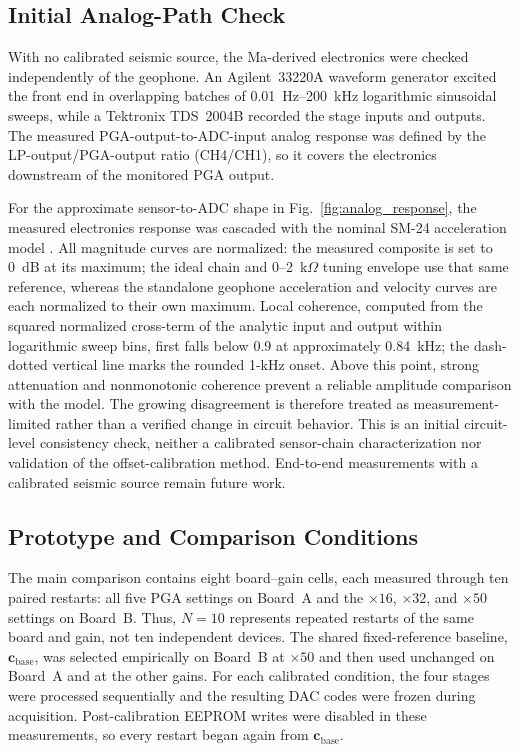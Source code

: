 \subsection{Initial Analog-Path Check}

With no calibrated seismic source, the Ma-derived electronics were checked independently of the geophone. An Agilent~33220A waveform generator excited the front end in overlapping batches of 0.01~Hz--200~kHz logarithmic sinusoidal sweeps, while a Tektronix TDS~2004B recorded the stage inputs and outputs. The measured PGA-output-to-ADC-input analog response was defined by the LP-output/PGA-output ratio (CH4/CH1), so it covers the electronics downstream of the monitored PGA output.

For the approximate sensor-to-ADC shape in Fig.~\ref{fig:analog_response}, the measured electronics response was cascaded with the nominal SM-24 acceleration model \cite{SM24}. All magnitude curves are normalized: the measured composite is set to 0~dB at its maximum; the ideal chain and 0--2~k$\Omega$ tuning envelope use that same reference, whereas the standalone geophone acceleration and velocity curves are each normalized to their own maximum. Local coherence, computed from the squared normalized cross-term of the analytic input and output within logarithmic sweep bins, first falls below 0.9 at approximately 0.84~kHz; the dash-dotted vertical line marks the rounded 1-kHz onset. Above this point, strong attenuation and nonmonotonic coherence prevent a reliable amplitude comparison with the model. The growing disagreement is therefore treated as measurement-limited rather than a verified change in circuit behavior. This is an initial circuit-level consistency check, neither a calibrated sensor-chain characterization nor validation of the offset-calibration method. End-to-end measurements with a calibrated seismic source remain future work.



\subsection{Prototype and Comparison Conditions}

The main comparison contains eight board--gain cells, each measured through ten paired restarts: all five PGA settings on Board~A and the $\times16$, $\times32$, and $\times50$ settings on Board~B. Thus, $N{=}10$ represents repeated restarts of the same board and gain, not ten independent devices. The shared fixed-reference baseline, $\boldsymbol{c}_{\mathrm{base}}$, was selected empirically on Board~B at $\times50$ and then used unchanged on Board~A and at the other gains. For each calibrated condition, the four stages were processed sequentially and the resulting DAC codes were frozen during acquisition. Post-calibration EEPROM writes were disabled in these measurements, so every restart began again from $\boldsymbol{c}_{\mathrm{base}}$.

